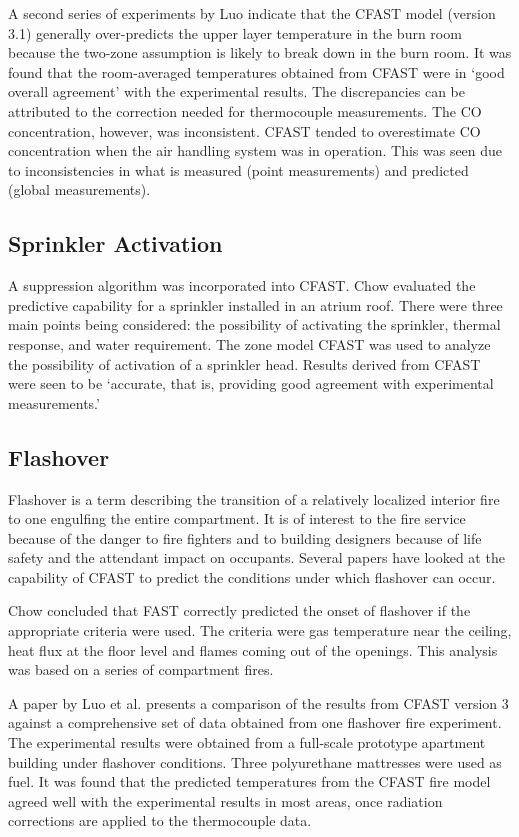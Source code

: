 A second series of experiments by Luo \cite{Luo:1997} indicate that the CFAST model (version 3.1) generally over-predicts the upper layer temperature in the burn room because the two-zone assumption is likely to break down in the burn room. It was found that the room-averaged temperatures obtained from CFAST were in `good overall agreement' with the experimental results. The discrepancies can be attributed to the correction needed for thermocouple measurements. The CO concentration, however, was inconsistent. CFAST tended to overestimate CO concentration when the air handling system was in operation. This was seen due to inconsistencies in what is measured (point measurements) and predicted (global measurements).

\subsection{Sprinkler Activation}

A suppression algorithm \cite{Madrzykowski:1992} was incorporated into CFAST. Chow \cite{Chow:1996a} evaluated the predictive capability for a sprinkler installed in an atrium roof. There were three main points being considered: the possibility of activating the sprinkler, thermal response, and water requirement. The zone model CFAST was used to analyze the possibility of activation of a sprinkler head. Results derived from CFAST were seen to be `accurate, that is, providing good agreement with experimental measurements.'

\subsection{Flashover}

Flashover is a term describing the transition of a relatively localized interior fire to one engulfing the entire compartment. It is of interest to the fire service because of the danger to fire fighters and to building designers because of life safety and the attendant impact on occupants. Several papers have looked at the capability of CFAST to predict the conditions under which flashover can occur.

Chow \cite{Valid:Chow_Flashover} concluded that FAST correctly predicted the onset of flashover if the appropriate criteria were used. The criteria were gas temperature near the ceiling, heat flux at the floor level and flames coming out of the openings. This analysis was based on a series of compartment fires.

A paper by Luo et al. \cite{Valid:Luo_Flashover} presents a comparison of the results from CFAST version 3 against a comprehensive set of data obtained from one flashover fire experiment. The experimental results were obtained from a full-scale prototype apartment building under flashover conditions. Three polyurethane mattresses were used as fuel. It was found that the predicted temperatures from the CFAST fire model agreed well with the experimental results in most areas, once radiation corrections are applied to the thermocouple data.

